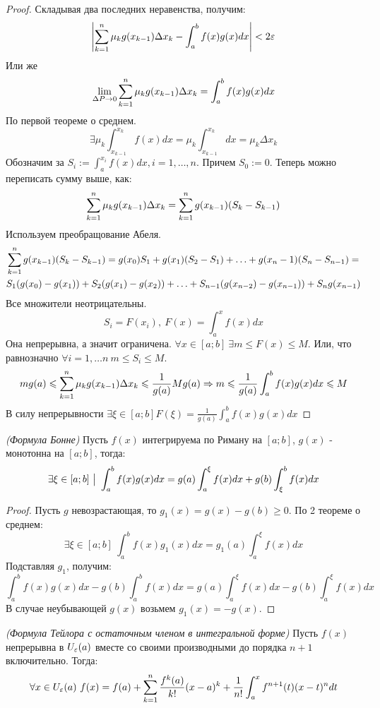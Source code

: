 \begin{proof}
	Складывая два последних неравенства, получим:
	\[
		\left|\sum\limits_{k = 1}^n\mu_kg(x_{k - 1}) \Delta x_k - \int_a^bf(x)g(x)dx\right| < 2\varepsilon
	\]
	Или же
	\[
		\lim\limits_{\Delta P \to 0} \sum\limits_{k = 1}^n\mu_kg(x_{k - 1})\Delta x_k = \int_a^bf(x)g(x)dx
	\]
	По первой теореме о среднем.
	\[
		\exists \mu_k \int_{x_{k - 1}}^{x_k}f(x)dx = \mu_k\int_{x_{k - 1}}^{x_k}dx = \mu_k\Delta x_k
	\]
	Обозначим за $S_i := \int_a^{x_i}f(x)dx, i = 1,\ldots, n$. Причем $S_0 := 0$. Теперь можно переписать сумму выше, как:
	\[
		\sum\limits_{k = 1}^n\mu_kg(x_{k - 1})\Delta x_k = \sum\limits_{k = 1}^ng(x_{k - 1})(S_k - S_{k - 1})
	\]
	Используем преобращование Абеля.
	\begin{multline*}
		\sum\limits_{k = 1}^ng(x_{k - 1})(S_k - S_{k - 1}) = g(x_0)S_1 +g(x_1)(S_2 - S_1) + \ldots + g(x_n - 1)(S_n - S_{n - 1}) =
		\\
		 S_1(g(x_0) - g(x_1)) + S_2(g(x_1) - g(x_2)) + \ldots + S_{n - 1}(g(x_{n - 2}) - g(x_{n - 1})) + S_ng(x_{n - 1})
	\end{multline*}
	Все множители неотрицательны.
	\[
		S_i = F(x_i),\ F(x) = \int_a^xf(x)dx
	\]
	Она непрерывна, а значит ограничена. $\forall x \in [a;b]\ \exists m \leq F(x) \leq M$. Или, что равнозначно $\forall i = 1,\ldots n\ m \leq S_i \leq M$. 
	\[
		mg(a) \leqslant \sum\limits_{k = 1}^n\mu_kg(x_{k - 1})\Delta x_k \leqslant \frac{1}{g(a)}Mg(a) \Rightarrow m \leqslant \frac{1}{g(a)}\int_a^bf(x)g(x)dx \leqslant M
	\]
	В силу непрерывности $\exists \xi \in [a;b] F(\xi) = \frac{1}{g(a)}\int_a^bf(x)g(x)dx$
\end{proof}


\begin{corollary} \textit{(Формула Бонне)}
	Пусть $f(x)$  интегрируема по Риману на $[a;b]$, $g(x)$ - монотонна на $[a;b]$, тогда:
	\[
		\exists \xi \in [a;b] \ \big|\  \int_a^bf(x)g(x)dx = g(a)\int_a^\xi f(x)dx + g(b)\int_\xi^bf(x)dx
	\]
\end{corollary}

\begin{proof}
	Пусть $g$  невозрастающая, то $g_1(x) = g(x) - g(b) \geq 0$. По 2 теореме о среднем:
	\[
		\exists \xi \in [a;b]\ \int_a^bf(x)g_1(x)dx = g_1(a)\int_a^\xi f(x)dx
	\]
	Подставляя $g_1$, получим:
	\[
		\int_a^bf(x)g(x)dx - g(b) \int_a^bf(x)dx = g(a)\int_a^\xi f(x)dx - g(b)\int_a^\xi f(x)dx
	\]
	В случае неубывающей $g(x)$ возьмем $g_1(x) = - g(x)$.
\end{proof}

\begin{theorem} \textit{(Формула Тейлора с остаточным членом в интегральной форме)}
	Пусть $f(x)$ непрерывна в $U_\varepsilon(a)$ вместе со своими производными до порядка $n + 1$ включительно.
	Тогда:
	\[
		\forall x \in U_\varepsilon(a)\ f(x) = f(a) + \sum\limits_{k = 1}^n\frac{f^k(a)}{k!}(x - a)^k + \frac{1}{n!}\int_a^xf^{n + 1}(t)(x - t)^ndt
	\]
\end{theorem}

